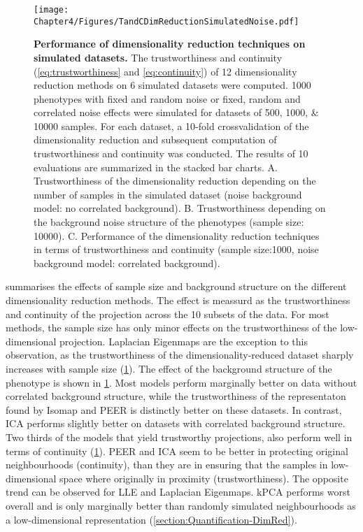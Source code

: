 \begin{figure}[hbtp]
	\centering
	\texttt{[image: Chapter4/Figures/TandCDimReductionSimulatedNoise.pdf]}
	\caption[\textbf{Performance of dimensionality reduction techniques on simulated datasets.}]{\textbf{Performance of dimensionality reduction techniques on simulated datasets.} The trustworthiness and continuity (\cref{eq:trustworthiness} and \cref{eq:continuity}) of \num{12} dimensionality reduction methods on \num{6} simulated datasets were computed.  \num{1000} phenotypes with fixed and random noise or fixed, random and correlated noise effects were simulated for datasets of \numlist{500;1000; 10000} samples. For each dataset, a \num{10}-fold crossvalidation of the dimensionality reduction and subsequent computation of trustworthiness and continuity was conducted. The results of \num{10} evaluations are summarized in the stacked bar charts. A. Trustworthiness of the dimensionality reduction depending on the number of samples in the simulated dataset (noise background model: no correlated background). B. Trustworthiness depending on the background noise structure of the phenotypes (sample size: \num{10000}). C. Performance of the dimensionality reduction techniques in terms of trustworthiness and continuity (sample size:\num{1000}, noise background model: correlated background).}
	 	\label{fig:TaC-noise}
\end{figure}


 summarises the effects of sample size and background structure on the different dimensionality reduction methods. The effect is meassurd as the trustworthiness and continuity of the projection across the \num{10} subsets of the data. For most methods, the sample size has only minor effects on the trustworthiness of the low-dimensional projection. Laplacian Eigenmaps are the exception to this observation, as the trustworthiness of the dimensionality-reduced dataset sharply increases with sample size (\cref{fig:TaC-noise}). The effect of the background structure of the phenotype is shown in \cref{fig:TaC-noise}. Most models perform marginally better on data without correlated background structure, while the trustworthiness of the representaton found by Isomap and PEER is distinctly better on these datasets. In contrast, ICA performs slightly better on datasets with correlated background structure. Two thirds of the models that yield trustworthy projections, also perform well in terms of continuity (\cref{fig:TaC-noise}). PEER and ICA seem to be better in protecting original neighbourhoods (continuity), than they are in ensuring that the samples in low-dimensional space where originally in proximity (trustworthiness).  The opposite trend can be observed for LLE and Laplacian Eigenmaps. kPCA performs worst overall and is only marginally better than randomly simulated neighbourhoods as a low-dimensional representation (\cref{section:Quantification-DimRed}).

